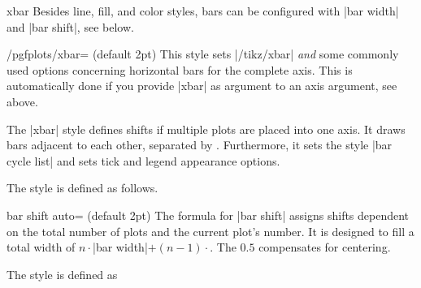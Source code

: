 {\begin{plottype}{xbar}
    Besides line, fill, and color styles, bars can be configured with
    |bar width| and |bar shift|, see below.
\end{plottype}

\begin{stylekey}{/pgfplots/xbar= (default 2pt)}
    This style sets |/tikz/xbar| \emph{and} some commonly used options
    concerning horizontal bars for the complete axis. This is automatically
    done if you provide |xbar| as argument to an axis argument, see above.

    The |xbar| style defines shifts if multiple plots are placed into one axis.
    It draws bars adjacent to each other, separated by . Furthermore, it sets the style |bar cycle list| and sets tick and
    legend appearance options.

    The style is defined as follows.
\begin{codeexample}
\end{codeexample}

    \begin{pgfplotskey}{bar shift auto= (default 2pt)}
        The formula for |bar shift| assigns shifts dependent on the total
        number of plots and the current plot's number. It is designed to fill a
        total width of $n \cdot $|bar width|$ + (n-1) \cdot $. The $0.5$ compensates for centering.

        The style is defined as
\begin{codeexample}
\end{codeexample}
    \end{pgfplotskey}
\end{stylekey}

}
